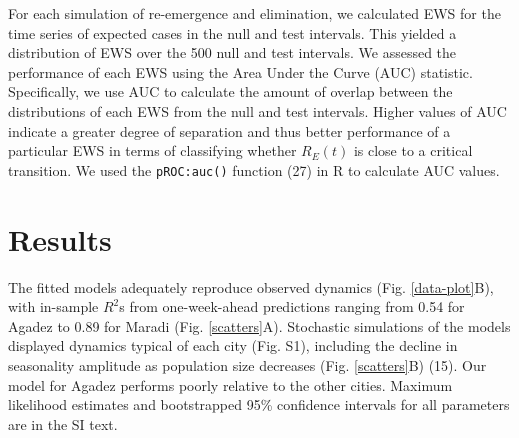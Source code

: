 \documentclass[3p]{elsarticle} %
\begin{document}
For each simulation of re-emergence and elimination, we calculated EWS
for the time series of expected cases in the null and test intervals.
This yielded a distribution of EWS over the 500 null and test intervals.
We assessed the performance of each EWS using the Area Under the Curve
(AUC) statistic. Specifically, we use AUC to calculate the amount of
overlap between the distributions of each EWS from the null and test
intervals. Higher values of AUC indicate a greater degree of separation
and thus better performance of a particular EWS in terms of classifying
whether \(R_E(t)\) is close to a critical transition. We used the
\texttt{pROC:auc()} function (27) in R to calculate AUC values.

\section{Results}\label{results}

The fitted models adequately reproduce observed dynamics (Fig.
\ref{data-plot}B), with in-sample \(R^2\)s from one-week-ahead
predictions ranging from 0.54 for Agadez to 0.89 for Maradi (Fig.
\ref{scatters}A). Stochastic simulations of the models displayed
dynamics typical of each city (Fig. S1), including the decline in
seasonality amplitude as population size decreases (Fig.
\ref{scatters}B) (15). Our model for Agadez performs poorly relative to
the other cities. Maximum likelihood estimates and bootstrapped 95\%
confidence intervals for all parameters are in the SI text.
\end{document}
